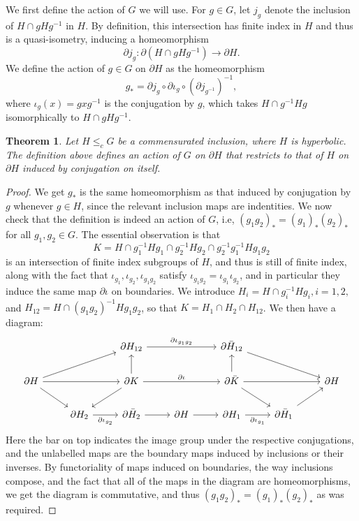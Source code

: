 \documentclass[11pt]{article}
\newtheorem{thm}{Theorem}[section]
\theoremstyle{definition}
\theoremstyle{remark}
\numberwithin{equation}{section}
\numberwithin{equation}{section}
\numberwithin{equation}{section}
\begin{document}
We first define the action of \( G \) we will use. For \( g \in G \), let \( j_g \) denote the inclusion of \( H \cap gHg^{-1} \) in \( H \). By definition, this intersection has finite index in \( H \) and thus is a quasi-isometry, inducing a homeomorphism 
\[
   \partial j_g :  \partial (H \cap gHg^{-1}) \to \partial H.
\] 
We define the action of \( g \in G \) on \( \partial H \) as the homeomorphism
\[
   g_* = \partial j_g \circ \partial \iota_g \circ \left(\partial j_{g^{-1}}\right)^{-1},
\]
where \( \iota_g (x) = g x g^{-1} \) is the conjugation by \( g \), which takes \( H \cap g^{-1}Hg \) isomorphically to \( H \cap gHg^{-1} \).

\begin{thm}
   Let \( H \leq_c G \) be a commensurated inclusion, where \( H \) is hyperbolic. The definition above defines an action of \( G \) on \( \partial H \) that restricts to that of \( H \) on \( \partial H \) induced by conjugation on itself.
\end{thm}
\begin{proof}
    We get \( g_* \) is the same homeomorphism as that induced by conjugation by \( g \) whenever \( g \in H \), since the relevant inclusion maps are indentities. We now check that the definition is indeed an action of \( G \), i.e, \( (g_1 g_2)_* = (g_1)_* (g_2)_* \) for all \( g_1, g_2 \in G \). The essential observation is that 
   \[
       K = H \cap g_1^{-1}Hg_1 \cap g_2^{-1}Hg_2 \cap g_2^{-1}g_1^{-1}Hg_1g_2
   \]
   is an intersection of finite index subgroups of \( H \), and thus is still of finite index, along with the fact that \( \iota_{g_1}, \iota_{g_2}, \iota_{g_1g_2} \) satisfy \( \iota_{g_1g_2} = \iota_{g_1} \iota_{g_2} \), and in particular they induce the same map \( \partial \iota \) on boundaries. We introduce \( H_i = H \cap g^{-1}_i H g_i, i = 1,2, \) and \( H_{12} = H \cap (g_1g_2)^{-1} H g_1g_2 \), so that \( K = H_1 \cap H_2 \cap H_{12} \). We then have a diagram:
\[\begin{tikzcd}
	&& \partial H_{12} && \partial \bar H_{12} && \\
	\partial H && \partial K && \partial \bar K && \partial H \\
	& \partial H_2 & \partial \bar H_2 & \partial H & \partial H_1 & \partial \bar H_1
	\arrow[from=1-3, to=1-5, "\partial \iota_{g_1 g_2}"]
	\arrow[from=1-5, to=2-7]
	\arrow[from=2-1, to=1-3]
	\arrow[from=2-1, to=2-3]
	\arrow[from=2-1, to=3-2]
	\arrow[from=2-3, to=1-3]
	\arrow[from=2-3, to=2-5, "\partial \iota"]
	\arrow[from=2-3, to=3-2]
	\arrow[from=2-5, to=1-5]
	\arrow[from=2-5, to=2-7]
	\arrow[from=2-5, to=3-6]
	\arrow[from=3-2, to=3-3, "\partial \iota_{g_2}"']
	\arrow[from=3-3, to=3-4]
	\arrow[from=3-4, to=3-5]
	\arrow[from=3-5, to=3-6, "\partial \iota_{g_1}"']
	\arrow[from=3-6, to=2-7]
\end{tikzcd}\]
Here the bar on top indicates the image group under the respective conjugations, and the unlabelled maps are the boundary maps induced by inclusions or their inverses. By functoriality of maps induced on boundaries, the way inclusions compose, and the fact that all of the maps in the diagram are homeomorphisms, we get the diagram is commutative, and thus \( (g_1g_2)_* = (g_1)_* (g_2)_* \) as was required.
\end{proof}
\end{document}
